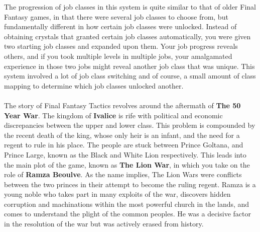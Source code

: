 The progression of job classes in this system is quite similar to that of older Final Fantasy games, in that there were several job classes to choose from, but fundamentally different in how certain
job classes were unlocked. 
Instead of obtaining crystals that granted certain job classes automatically, you were given two starting job classes and expanded upon them. 
Your job progress reveals others, and if you took multiple levels in multiple jobs, your amalgamated experience in those two jobs might reveal another job class that was unique. 
This system involved a lot of job class switching and of course, a small amount of class mapping to determine which job classes unlocked another.
%
\\\\
%
The story of Final Fantasy Tactics revolves around the aftermath of \textbf{The 50 Year War}. 
The kingdom of \textbf{Ivalice} is rife with political and economic discrepancies between the upper and lower class. 
This problem is compounded by the recent death of the king, whose only heir is an infant, and the need for a regent to rule in his place. 
The people are stuck between Prince Goltana, and Prince Large, known as the Black and White Lion respectively.
This leads into the main plot of the game, known as \textbf{The Lion War}, in which you take on the role of \textbf{Ramza Beoulve}. 
As the name implies, The Lion Wars were conflicts between the two princes in their attempt to become the ruling regent. 
Ramza is a young noble who takes part in many exploits of the war, discovers hidden corruption and machinations within the most powerful church in the lands, and comes to understand the plight of the common peoples. 
He was a decisive factor in the resolution of the war but was actively erased from history.
%
%
\\\\
\vfill
